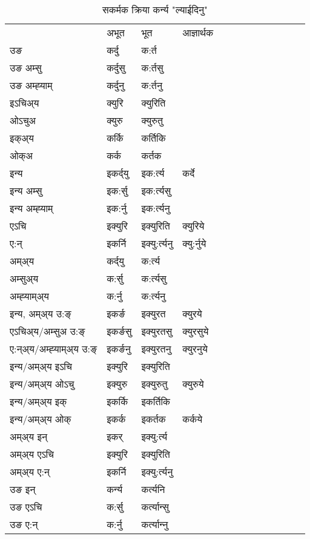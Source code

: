 \begin{table}[H]
\centering
\caption{\label{urt.vt} सकर्मक क्रिया  कर्न्य  "ल्याईदिनु"  }
\begin{tabular}{l|l|l|l|l|l|l|l|l|l|l|l|l}  \toprule
&अभूत & भूत & आज्ञार्थक \\ 
उङ &कर्दु &क:र्त \\ 
उङ अम्सु&कर्दुसु &क:र्तसु \\ 
उङ अम्ह्‍याम्&कर्दुनु &क:र्तनु \\ 
इऽचिअ्य &क्युरि &क्युरिति   \\ 
ओऽचुअ        &क्युरु &क्युरुतु   \\ 
इक्अ्य&कर्कि &कर्तिकि   \\ 
ओक्अ &कर्क &कर्तक   \\ 
इन्य & इकर्द्‌यु  & इक:र्त्य &कर्दे  \\ 
इन्य अम्सु& इक:र्सु  & इक:र्त्यसु   \\ 
इन्य अम्ह्‍याम्& इक:र्नु  & इक:र्त्यनु   \\ 
एऽचि & इक्युरि & इक्युरिति &क्युरिये    \\ 
ए:न् & इकर्नि  & इक्यु:र्त्यनु &क्यु:र्नुये  \\ 
अम्अ्य & कर्द्‌यु  & क:र्त्य  \\ 
अम्सुअ्य & क:र्सु & क:र्त्यसु  \\ 
अम्ह्‍याम्अ्य & क:र्नु  & क:र्त्यनु \\ 
\midrule
इन्य, अम्अ्य उ:ङ्‌ &इकर्ङ &इक्युरत &क्युरये \\ 
एऽचिअ्य/अम्सुअ उ:ङ्‌ &इकर्ङसु &इक्युरतसु &क्युरसुये \\ 
ए:न्अ्य/अम्ह्‍याम्अ्य उ:ङ्‌ &इकर्ङनु &इक्युरतनु &क्युरनुये \\ 
इन्य/अम्अ्य इऽचि &इक्युरि &इक्युरिति    \\ 
इन्य/अम्अ्य ओऽचु &इक्युरु &इक्युरुतु  &क्युरुये  \\ 
इन्य/अम्अ्य इक् &इकर्कि &इकर्तिकि   \\ 
इन्य/अम्अ्य ओक् &इकर्क &इकर्तक  &कर्कये  \\ 
अम्अ्य इन् & इकर् & इक्यु:र्त्य   \\ 
अम्अ्य एऽचि & इक्युरि & इक्युरिति    \\ 
अम्अ्य ए:न् & इकर्नि  & इक्यु:र्त्यनु  \\ 
\midrule
उङ इन् & कर्न्य  & कर्त्यनि  \\ 
उङ एऽचि & क:र्सु  & कर्त्यान्सु   \\ 
उङ ए:न्& क:र्नु  & कर्त्यान्‍नु   \\ 
\bottomrule
\end{tabular}
\end{table}
